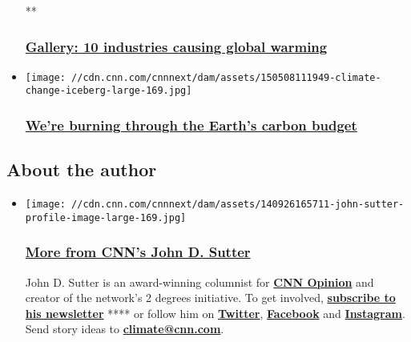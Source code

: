 \begin{itemize}
  **

  \hypertarget{gallery-10-industries-causing-global-warming}{%
  \subsubsection{\texorpdfstring{\href{/2015/08/13/opinions/gallery/top-climate-change-contributors/index.html}{Gallery:
  10 industries causing global
  warming}}{Gallery: 10 industries causing global warming}}\label{gallery-10-industries-causing-global-warming}}
\item
  \href{/2015/05/12/opinions/sutter-400-carbon-dioxide/index.html}{}

  \texttt{[image: //cdn.cnn.com/cnnnext/dam/assets/150508111949-climate-change-iceberg-large-169.jpg]}

  \hypertarget{were-burning-through-the-earths-carbon-budget}{%
  \subsubsection{\texorpdfstring{\href{/2015/05/12/opinions/sutter-400-carbon-dioxide/index.html}{We're
  burning through the Earth's carbon
  budget}}{We're burning through the Earth's carbon budget}}\label{were-burning-through-the-earths-carbon-budget}}
\end{itemize}

\hypertarget{about-the-author-}{%
\subsection{About the author~}\label{about-the-author-}}

\begin{itemize}
\item
  \href{http://www.cnn.com/profiles/john-d-sutter}{}

  \texttt{[image: //cdn.cnn.com/cnnnext/dam/assets/140926165711-john-sutter-profile-image-large-169.jpg]}

  \hypertarget{more-from-cnns-john-d-sutter}{%
  \subsubsection{\texorpdfstring{\href{http://www.cnn.com/profiles/john-d-sutter}{More
  from CNN's John D.
  Sutter}}{More from CNN's John D. Sutter}}\label{more-from-cnns-john-d-sutter}}

  John D. Sutter is an award-winning columnist for
  \href{http://cnn.com/opinions}{\textbf{CNN Opinion}} and creator of
  the network's 2 degrees initiative. To get involved,
  \href{http://tinyletter.com/jdsutter}{\textbf{subscribe to his
  newsletter}} **** or follow him on
  \href{https://twitter.com/jdsutter}{\textbf{Twitter}},
  \href{https://www.facebook.com/jdsutter}{\textbf{Facebook}} and
  \href{http://instagram.com/jdsutter}{\textbf{Instagram}}. Send story
  ideas to \href{mailto:climate@cnn.com}{\textbf{climate@cnn.com}}.
\end{itemize}

